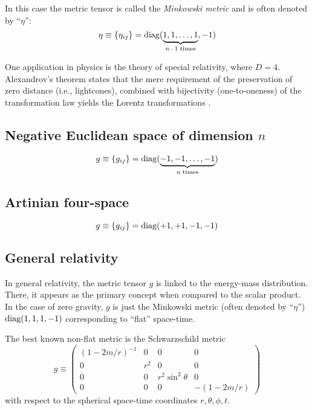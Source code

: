 In this case the metric tensor is called the
{\em Minkowski metric}
and is often denoted by  ``$\eta$'':
\begin{equation}
\eta \equiv \{\eta_{ij}\}={\rm diag} (\underbrace{1,1,\ldots ,1}_{n-1\; {\rm times}},-1)
\label{2012-m-ch-tensor-minspn}
\end{equation}


One application in physics is the theory of special relativity,
where $D=4$.
Alexandrov's theorem states that the mere requirement of the preservation of
zero distance (i.e., lightcones), combined with bijectivity (one-to-oneness) of the transformation law
yields the Lorentz transformations
\cite{alex1,alex2,alex3,alex-col,borchers-heger,benz,lester,svozil-2001-convention}.



\subsection*{Negative Euclidean space of dimension $n$}

\begin{equation}
g\equiv \{g_{ij}\}={\rm diag} (\underbrace{-1,-1,\ldots ,-1}_{n\; {\rm times}})
\end{equation}

\subsection*{Artinian four-space}

\begin{equation}
g\equiv \{g_{ij}\}={\rm diag} (+1,+1,-1 ,-1)
\end{equation}



\subsection*{General relativity}

In general relativity, the metric tensor $g$ is linked to the energy-mass distribution.
There, it appears as the primary concept when compared to the scalar product.
In the case of zero gravity, $g$ is just the  Minkowski metric (often denoted by  ``$\eta$'')
${\rm diag} (1,1,1,-1) $ corresponding to ``flat'' space-time.

The best known non-flat metric is the Schwarzschild metric
\begin{equation}
g
\equiv
\begin{pmatrix}
(1-2m/r)^{-1}&0&0&0\\
0&r^2&0&0\\
0&0&r^2\sin^2 \theta &0\\
0&0&0&- \left( 1-{2m/r}\right)
\end{pmatrix}
\end{equation}
with respect to the spherical space-time coordinates $r,\theta ,\phi ,t$.


